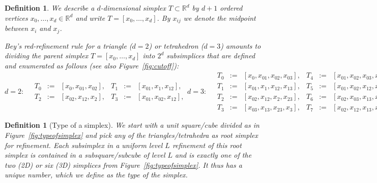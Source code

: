 \documentclass[a4paper,11pt]{article}
\newcommand{\sR}{\mathbb{R}}
\newtheorem{dfn}[thm]{Definition}
\begin{document}
\begin{dfn}
  We describe a $d$-dimensional simplex $T\subset\sR^d$ by $d+1$ ordered
  vertices $x_0,\dots,x_d\in\sR^d$
  and write $T=[x_0,\dots,x_d]$.
  By $x_{ij}$ we denote the midpoint between $x_i$ and $x_j$.

  Bey's \emph{red-refinement} rule \cite{Bey92} for a triangle ($d=2$) or
  tetrahedron ($d=3$) amounts to dividing the parent simplex
  $T=[x_0,\dots,x_d]$ into $2^d$ subsimplices that are defined and enumerated
  as follows (see also Figure~\ref{fig:cutoff}):
 \begin{subequations}
\label{eq:childnumbers}
 \begin{equation}
 \label{eq:childnumbers_2d}
 d=2:\quad
 \begin{array}{cccccl}
  T_0&:=&[x_0,x_{01},x_{02}], &  T_1&:=&[x_{01},x_{1},x_{12}],\\
  T_2&:=&[x_{02},x_{12},x_{2}], & T_3&:=&[x_{01},x_{02},x_{12}],
  \end{array}
 \end{equation}
 \begin{equation}
\label{eq:childnumbers3d}
d=3:\quad
 \begin{array}{cccccc}
 T_0 &:=& [x_0,x_{01},x_{02},x_{03}],   & T_4 &:=& [x_{01},x_{02},x_{03},x_{13}],\\
 T_1 &:=& [x_{01},x_{1},x_{12},x_{13}], & T_5 &:=& [x_{01},x_{02},x_{12},x_{13}],\\
 T_2 &:=& [x_{02},x_{12},x_{2},x_{23}], & T_6 &:=& [x_{02},x_{03},x_{13},x_{23}],\\
 T_3 &:=& [x_{03},x_{13},x_{23},x_{3}], & T_7 &:=& [x_{02},x_{12},x_{13},x_{23}].


\end{array}
 \end{equation}
 \end{subequations}
\end{dfn}




\begin{dfn}[Type of a simplex]
  We start with a unit square/cube divided as in Figure~\ref{fig:typeofsimplex}
  and pick any of the triangles/tetrahedra as root simplex for refinement.
  Each subsimplex in a uniform level $L$ refinement of this root simplex
  is contained in a subsquare/subcube of level $L$ and is exactly one of the
  two (2D) or six (3D) simplices from Figure~\ref{fig:typeofsimplex}.
  It thus has a unique number, which we define as the \emph{type} of the simplex.
\end{dfn}
\end{document}
